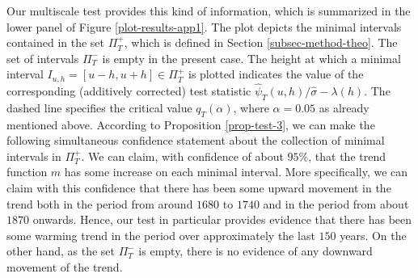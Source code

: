 Our multiscale test provides this kind of information, which is summarized in the lower panel of Figure \ref{plot-results-app1}. The plot depicts the minimal intervals contained in the set $\Pi_T^+$, which is defined in Section \ref{subsec-method-theo}. The set of intervals $\Pi_T^-$ is empty in the present case. The height at which a minimal interval $I_{u,h} = [u-h,u+h] \in \Pi_T^+$ is plotted indicates the value of the corresponding (additively corrected) test statistic $\widehat{\psi}_T(u,h) / \widehat{\sigma} - \lambda(h)$. The dashed line specifies the critical value $q_T(\alpha)$, where $\alpha = 0.05$ as already mentioned above. According to Proposition \ref{prop-test-3}, we can make the following simultaneous confidence statement about the collection of minimal intervals in $\Pi_T^+$. We can claim, with confidence of about $95\%$, that the trend function $m$ has some increase on each minimal interval. More specifically, we can claim with this confidence that there has been some upward movement in the trend both in the period from around $1680$ to $1740$ and in the period from about $1870$ onwards. Hence, our test in particular provides evidence that there has been some warming trend in the period over approximately the last $150$ years. On the other hand, as the set $\Pi_T^-$ is empty, there is no evidence of any downward movement of the trend.
